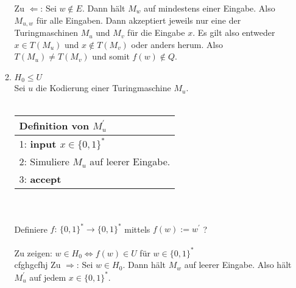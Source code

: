 \documentclass[12pt]{scrartcl}
\begin{document}
\begin{enumerate}
\begin{enumerate}
               Zu $\Leftarrow$: Sei $w \notin E$. Dann hält $M_w$ auf mindestens einer Eingabe. Also
               $M_{u,w}$ für alle Eingaben. Dann akzeptiert jeweils nur eine der Turingmaschinen $M_u$ und 
               $M_v$ für die Eingabe $x$. Es gilt also entweder $x \in T(M_u)$ und $x \notin T(M_v)$ oder anders herum.
               Also $T(M_u) \neq T(M_v)$ und somit $f(w) \notin Q$.
        \item $H_0 \leq U$\\
              Sei $u$ die Kodierung einer Turingmaschine $M_{u}$.\\\\
              \begin{tabular}[h!]{l}
                \hline
                Definition von $M_{u}^{'}$\\\hline
                1: \textbf{input $x \in \{0,1\}^*$}\\
                2: Simuliere $M_{u}$ auf leerer Eingabe.\\
                3: \textbf{accept}\\\hline
              \end{tabular}\\\\
              Definiere $f: \, \{0,1\}^* \rightarrow \{0,1\}^*$ mittels $f(w) := w^{'}$ ?\\\\
              Zu zeigen: $w \in H_0 \Longleftrightarrow f(w) \in U $ für $w \in \{0,1\}^*$\\
              cfghgcfhj
              Zu $\Rightarrow$: Sei $w \in H_0$. Dann hält $M_{w}$ auf leerer Eingabe. Also hält $M_{u}^{'}$ auf jedem $x \in \{0,1\}^*$.
    \end{enumerate}
\end{enumerate}
\end{document}
